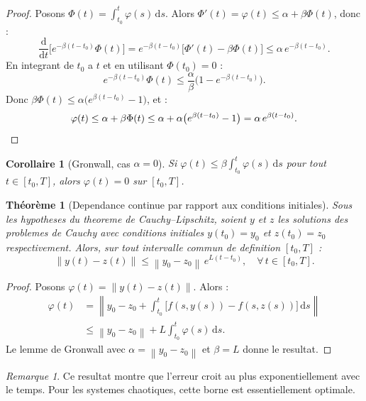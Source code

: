 \documentclass[12pt,a4paper,openany]{book}
\theoremstyle{definition}
\theoremstyle{plain}
\newtheorem{theoreme}[definition]{Théorème}
\newtheorem{corollaire}[definition]{Corollaire}
\theoremstyle{remark}
\newtheorem{remarque}[definition]{Remarque}
\newcommand{\dd}{\mathrm{d}}
\newcommand{\norm}[1]{\left\|#1\right\|}
\begin{document}
\begin{proof}
Posons $\Phi(t) = \int_{t_0}^{t} \varphi(s)\, \dd s$. Alors $\Phi'(t) = \varphi(t) \leq \alpha + \beta \Phi(t)$, donc :
\[
  \frac{\dd}{\dd t}\bigl[e^{-\beta(t-t_0)} \Phi(t)\bigr] = e^{-\beta(t-t_0)}\bigl[\Phi'(t) - \beta \Phi(t)\bigr] \leq \alpha\, e^{-\beta(t-t_0)}.
\]
En integrant de $t_0$ a $t$ et en utilisant $\Phi(t_0) = 0$ :
\[
  e^{-\beta(t-t_0)} \Phi(t) \leq \frac{\alpha}{\beta}\bigl(1 - e^{-\beta(t-t_0)}\bigr).
\]
Donc $\beta\Phi(t) \leq \alpha\bigl(e^{\beta(t-t_0)} - 1\bigr)$, et :
\[
  \varphi(t) \leq \alpha + \beta\Phi(t) \leq \alpha + \alpha\bigl(e^{\beta(t-t_0)} - 1\bigr) = \alpha\, e^{\beta(t-t_0)}. \qedhere
\]
\end{proof}

\begin{corollaire}[Gronwall, cas $\alpha = 0$]\label{cor:gronwall-zero}
Si $\varphi(t) \leq \beta \int_{t_0}^{t} \varphi(s)\, \dd s$ pour tout $t \in [t_0, T]$, alors $\varphi(t) = 0$ sur $[t_0, T]$.
\end{corollaire}

\begin{theoreme}[Dependance continue par rapport aux conditions initiales]\label{thm:dependance-continue}
Sous les hypotheses du theoreme de Cauchy--Lipschitz, soient $y$ et $z$ les solutions des problemes de Cauchy avec conditions initiales $y(t_0) = y_0$ et $z(t_0) = z_0$ respectivement. Alors, sur tout intervalle commun de definition $[t_0, T]$ :
\[
  \norm{y(t) - z(t)} \leq \norm{y_0 - z_0}\, e^{L(t - t_0)}, \quad \forall\, t \in [t_0, T].
\]
\end{theoreme}

\begin{proof}
Posons $\varphi(t) = \norm{y(t) - z(t)}$. Alors :
\begin{align*}
\varphi(t) &= \norm{y_0 - z_0 + \int_{t_0}^{t}\bigl[f(s, y(s)) - f(s, z(s))\bigr]\, \dd s} \\
  &\leq \norm{y_0 - z_0} + L \int_{t_0}^{t} \varphi(s)\, \dd s.
\end{align*}
Le lemme de Gronwall avec $\alpha = \norm{y_0 - z_0}$ et $\beta = L$ donne le resultat.
\end{proof}

\begin{remarque}\label{rem:sensibilite}
Ce resultat montre que l'erreur croit au plus exponentiellement avec le temps. Pour les systemes chaotiques, cette borne est essentiellement optimale.
\end{remarque}
\end{document}
